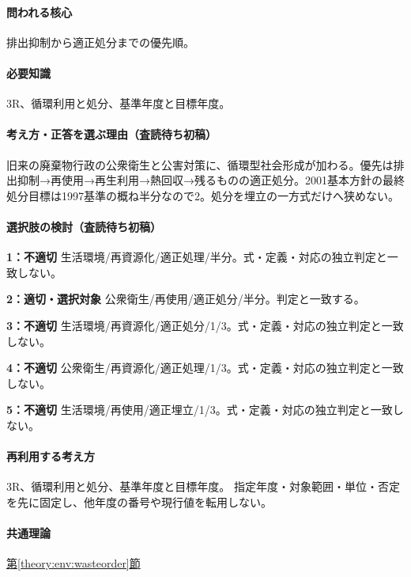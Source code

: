 \paragraph{問われる核心} 排出抑制から適正処分までの優先順。

\paragraph{必要知識} 3R、循環利用と処分、基準年度と目標年度。

\paragraph{考え方・正答を選ぶ理由（査読待ち初稿）} 旧来の廃棄物行政の公衆衛生と公害対策に、循環型社会形成が加わる。優先は排出抑制→再使用→再生利用→熱回収→残るものの適正処分。2001基本方針の最終処分目標は1997基準の概ね半分なので2。処分を埋立の一方式だけへ狭めない。

\paragraph{選択肢の検討（査読待ち初稿）}\mbox{}\par

\noindent\textbf{1：不適切} 生活環境/再資源化/適正処理/半分。式・定義・対応の独立判定と一致しない。\par

\noindent\textbf{2：適切・選択対象} 公衆衛生/再使用/適正処分/半分。判定と一致する。\par

\noindent\textbf{3：不適切} 生活環境/再資源化/適正処分/1/3。式・定義・対応の独立判定と一致しない。\par

\noindent\textbf{4：不適切} 公衆衛生/再資源化/適正処理/1/3。式・定義・対応の独立判定と一致しない。\par

\noindent\textbf{5：不適切} 生活環境/再使用/適正埋立/1/3。式・定義・対応の独立判定と一致しない。\par

\paragraph{再利用する考え方} 3R、循環利用と処分、基準年度と目標年度。 指定年度・対象範囲・単位・否定を先に固定し、他年度の番号や現行値を転用しない。

\paragraph{共通理論} \hyperref[theory:env:wasteorder]{第\ref*{theory:env:wasteorder}節}

